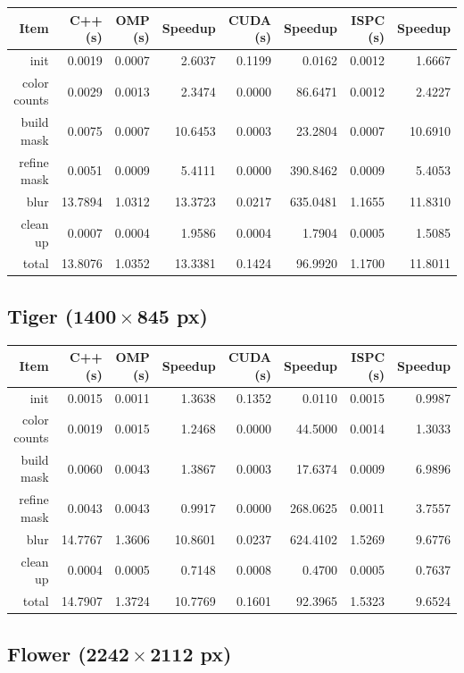 \documentclass[12pt]{article}
\begin{document}
\begin{tabular}{r|r|r|r|r|r|r|r}
    Item & C++ (s) & OMP (s) & Speedup & CUDA (s) & Speedup & ISPC (s) & Speedup
\\  \hline
    init & 0.0019 & 0.0007 & 2.6037 & 0.1199 & 0.0162 & 0.0012 & 1.6667
\\  color counts & 0.0029 & 0.0013 & 2.3474 & 0.0000 & 86.6471 & 0.0012 & 2.4227
\\  build mask & 0.0075 & 0.0007 & 10.6453 & 0.0003 & 23.2804 & 0.0007 & 10.6910
\\  refine mask & 0.0051 & 0.0009 & 5.4111 & 0.0000 & 390.8462 & 0.0009 & 5.4053
\\  blur & 13.7894 & 1.0312 & 13.3723 & 0.0217 & 635.0481 & 1.1655 & 11.8310
\\  clean up & 0.0007 & 0.0004 & 1.9586 & 0.0004 & 1.7904 & 0.0005 & 1.5085
\\  \hline
    total & 13.8076 & 1.0352 & 13.3381 & 0.1424 & 96.9920 & 1.1700 & 11.8011
\end{tabular}

\subsection{Tiger ($\mathbf{1400 \times 845}$ px)}

\begin{tabular}{r|r|r|r|r|r|r|r}
    Item & C++ (s) & OMP (s) & Speedup & CUDA (s) & Speedup & ISPC (s) & Speedup
\\  \hline
    init & 0.0015 & 0.0011 & 1.3638 & 0.1352 & 0.0110 & 0.0015 & 0.9987
\\  color counts & 0.0019 & 0.0015 & 1.2468 & 0.0000 & 44.5000 & 0.0014 & 1.3033
\\  build mask & 0.0060 & 0.0043 & 1.3867 & 0.0003 & 17.6374 & 0.0009 & 6.9896
\\  refine mask & 0.0043 & 0.0043 & 0.9917 & 0.0000 & 268.0625 & 0.0011 & 3.7557
\\  blur & 14.7767 & 1.3606 & 10.8601 & 0.0237 & 624.4102 & 1.5269 & 9.6776
\\  clean up & 0.0004 & 0.0005 & 0.7148 & 0.0008 & 0.4700 & 0.0005 & 0.7637
\\  \hline
    total & 14.7907 & 1.3724 & 10.7769 & 0.1601 & 92.3965 & 1.5323 & 9.6524
\end{tabular}

\subsection{Flower ($\mathbf{2242 \times 2112}$ px)}
\end{document}
